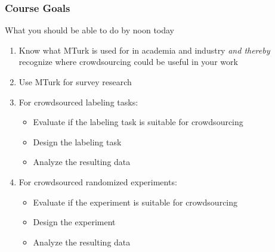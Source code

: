 \documentclass[slides]{beamer} %
\begin{document}
\begin{frame}\frametitle{Course Goals}

\begin{block}{What you should be able to do by noon today} \pause
\begin{enumerate}[A]
\item Know what MTurk is used for in academia and industry \textit{and thereby} recognize where crowdsourcing could be useful in your work \pause

\item Use MTurk for survey research \pause

\item For crowdsourced labeling tasks: \pause
\begin{itemize}
\item Evaluate if the labeling task is suitable for crowdsourcing \pause
\item Design the labeling task \pause
\item Analyze the resulting data \pause
\end{itemize}

\item For crowdsourced randomized experiments: \pause
\begin{itemize}
\item Evaluate if the experiment is suitable for crowdsourcing \pause
\item Design the experiment \pause
\item Analyze the resulting data \pause
\end{itemize}
\end{enumerate}
\end{block}

\end{frame}
\end{document}
